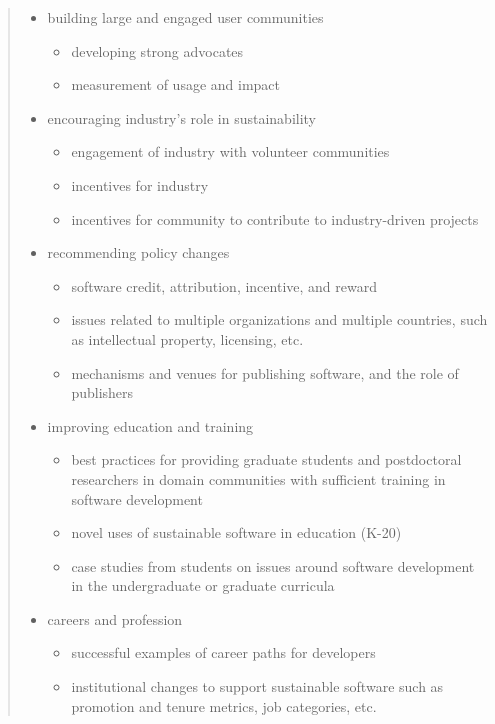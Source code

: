 \documentclass[11pt, oneside]{amsart}
\begin{document}
\begin{quote}
\begin{itemize}
\item building large and engaged user communities
\begin{itemize}
\item developing strong advocates
\item measurement of usage and impact
\end{itemize}

\item encouraging industry's role in sustainability
\begin{itemize}
\item engagement of industry with volunteer communities
\item incentives for industry
\item incentives for community to contribute to industry-driven projects
\end{itemize}

\item recommending policy changes
\begin{itemize}
\item software credit, attribution, incentive, and reward
\item issues related to multiple organizations and multiple countries, such as
intellectual property, licensing, etc.
\item mechanisms and venues for publishing software, and the role of publishers
\end{itemize}

\item improving education and training
\begin{itemize}
\item best practices for providing graduate students and postdoctoral
researchers in domain communities with sufficient training in software
development
\item novel uses of sustainable software in education (K-20)
\item case studies from students on issues around software development in the
undergraduate or graduate curricula
\end{itemize}

\item careers and profession
\begin{itemize}
\item successful examples of career paths for developers
\item institutional changes to support sustainable software such as promotion
and tenure metrics, job categories, etc.
\end{itemize}

\end{itemize}

\end{quote}
\end{document}
